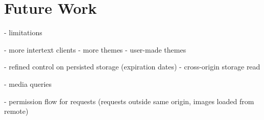 
\section{Future Work} \label{futureWork}

- limitations

- more intertext clients
- more themes
- user-made themes

- refined control on persisted storage (expiration dates)
- cross-origin storage read

- media queries

- permission flow for requests (requests outside same origin, images loaded from remote)